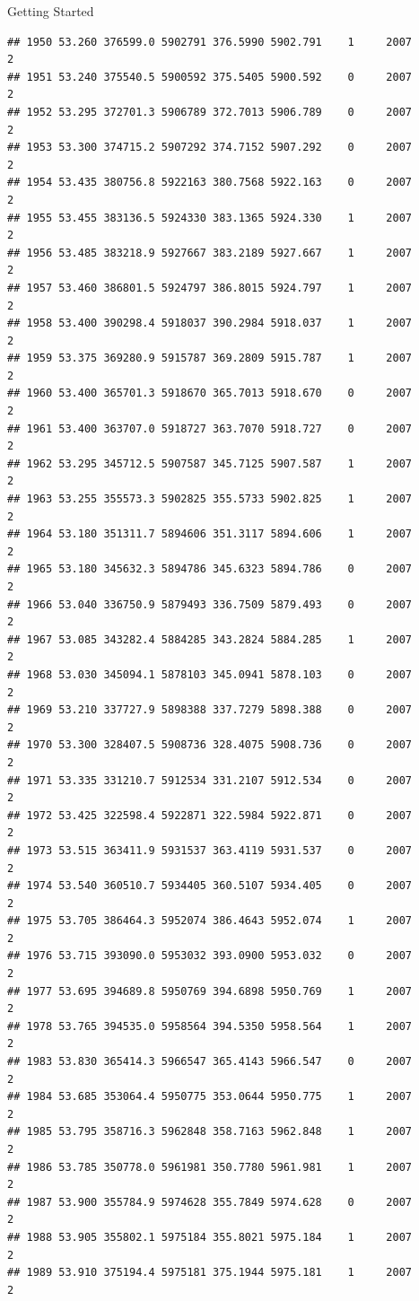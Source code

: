 \documentclass[
  ignorenonframetext,
]{beamer}
\begin{document}
\begin{frame}[fragile]{Getting Started}
\begin{verbatim}
## 1950 53.260 376599.0 5902791 376.5990 5902.791    1     2007        2
## 1951 53.240 375540.5 5900592 375.5405 5900.592    0     2007        2
## 1952 53.295 372701.3 5906789 372.7013 5906.789    0     2007        2
## 1953 53.300 374715.2 5907292 374.7152 5907.292    0     2007        2
## 1954 53.435 380756.8 5922163 380.7568 5922.163    0     2007        2
## 1955 53.455 383136.5 5924330 383.1365 5924.330    1     2007        2
## 1956 53.485 383218.9 5927667 383.2189 5927.667    1     2007        2
## 1957 53.460 386801.5 5924797 386.8015 5924.797    1     2007        2
## 1958 53.400 390298.4 5918037 390.2984 5918.037    1     2007        2
## 1959 53.375 369280.9 5915787 369.2809 5915.787    1     2007        2
## 1960 53.400 365701.3 5918670 365.7013 5918.670    0     2007        2
## 1961 53.400 363707.0 5918727 363.7070 5918.727    0     2007        2
## 1962 53.295 345712.5 5907587 345.7125 5907.587    1     2007        2
## 1963 53.255 355573.3 5902825 355.5733 5902.825    1     2007        2
## 1964 53.180 351311.7 5894606 351.3117 5894.606    1     2007        2
## 1965 53.180 345632.3 5894786 345.6323 5894.786    0     2007        2
## 1966 53.040 336750.9 5879493 336.7509 5879.493    0     2007        2
## 1967 53.085 343282.4 5884285 343.2824 5884.285    1     2007        2
## 1968 53.030 345094.1 5878103 345.0941 5878.103    0     2007        2
## 1969 53.210 337727.9 5898388 337.7279 5898.388    0     2007        2
## 1970 53.300 328407.5 5908736 328.4075 5908.736    0     2007        2
## 1971 53.335 331210.7 5912534 331.2107 5912.534    0     2007        2
## 1972 53.425 322598.4 5922871 322.5984 5922.871    0     2007        2
## 1973 53.515 363411.9 5931537 363.4119 5931.537    0     2007        2
## 1974 53.540 360510.7 5934405 360.5107 5934.405    0     2007        2
## 1975 53.705 386464.3 5952074 386.4643 5952.074    1     2007        2
## 1976 53.715 393090.0 5953032 393.0900 5953.032    0     2007        2
## 1977 53.695 394689.8 5950769 394.6898 5950.769    1     2007        2
## 1978 53.765 394535.0 5958564 394.5350 5958.564    1     2007        2
## 1983 53.830 365414.3 5966547 365.4143 5966.547    0     2007        2
## 1984 53.685 353064.4 5950775 353.0644 5950.775    1     2007        2
## 1985 53.795 358716.3 5962848 358.7163 5962.848    1     2007        2
## 1986 53.785 350778.0 5961981 350.7780 5961.981    1     2007        2
## 1987 53.900 355784.9 5974628 355.7849 5974.628    0     2007        2
## 1988 53.905 355802.1 5975184 355.8021 5975.184    1     2007        2
## 1989 53.910 375194.4 5975181 375.1944 5975.181    1     2007        2

\end{verbatim}
\end{frame}
\end{document}
